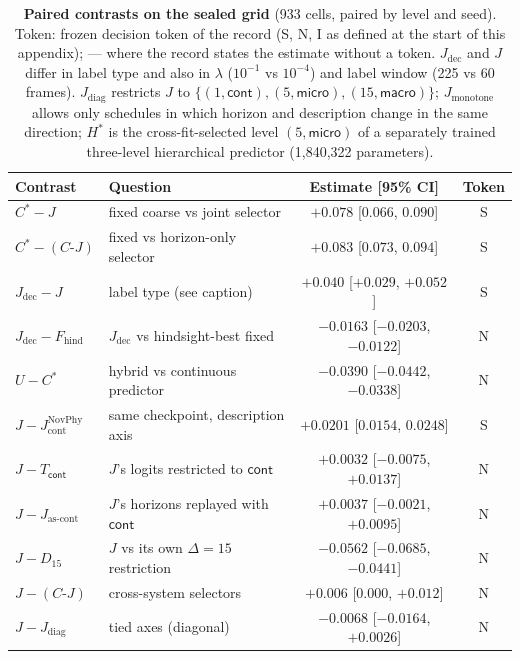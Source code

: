 \begin{table}[h]
\begin{revblock}
\centering
\footnotesize
\setlength{\tabcolsep}{3pt}
\caption{\textbf{Paired contrasts on the sealed grid} (933 cells, paired by level and seed). Token: frozen decision token of the record (S, N, I as defined at the start of this appendix); --- where the record states the estimate without a token. $J_{\mathrm{dec}}$ and $J$ differ in label type and also in $\lambda$ ($10^{-1}$ vs $10^{-4}$) and label window (225 vs 60 frames). $J_{\mathrm{diag}}$ restricts $J$ to $\{(1,\textsf{cont}),(5,\textsf{micro}),(15,\textsf{macro})\}$; $J_{\mathrm{monotone}}$ allows only schedules in which horizon and description change in the same direction; $H^{*}$ is the cross-fit-selected level $(5,\textsf{micro})$ of a separately trained three-level hierarchical predictor (1,840,322 parameters).}
\label{tab:app:res:controls}
\begin{tabular}{@{}llcc@{}}
\toprule
Contrast & Question & Estimate [95\% CI] & Token \\
\midrule
$C^{*}-J$ & fixed coarse vs joint selector & $+0.078$ [$0.066$, $0.090$] & S \\
$C^{*}-(C\text{-}J)$ & fixed vs horizon-only selector & $+0.083$ [$0.073$, $0.094$] & S \\
$J_{\mathrm{dec}}-J$ & label type (see caption) & $+0.040$ [$+0.029$, $+0.052$] & S \\
$J_{\mathrm{dec}}-F_{\mathrm{hind}}$ & $J_{\mathrm{dec}}$ vs hindsight-best fixed & $-0.0163$ [$-0.0203$, $-0.0122$] & N \\
$U-C^{*}$ & hybrid vs continuous predictor & $-0.0390$ [$-0.0442$, $-0.0338$] & N \\
$J-J_{\mathrm{cont}}^{\mathrm{NovPhy}}$ & same checkpoint, description axis & $+0.0201$ [$0.0154$, $0.0248$] & S \\
$J-T_{\textsf{cont}}$ & $J$'s logits restricted to $\textsf{cont}$ & $+0.0032$ [$-0.0075$, $+0.0137$] & N \\
$J-J_{\text{as-cont}}$ & $J$'s horizons replayed with $\textsf{cont}$ & $+0.0037$ [$-0.0021$, $+0.0095$] & N \\
$J-D_{15}$ & $J$ vs its own $\Delta=15$ restriction & $-0.0562$ [$-0.0685$, $-0.0441$] & N \\
$J-(C\text{-}J)$ & cross-system selectors & $+0.006$ [$0.000$, $+0.012$] & N \\
$J-J_{\mathrm{diag}}$ & tied axes (diagonal) & $-0.0068$ [$-0.0164$, $+0.0026$] & N \\

\end{tabular}
\end{revblock}
\end{table}
